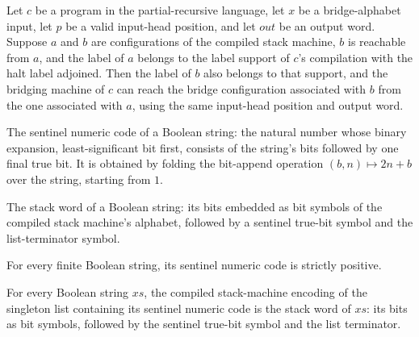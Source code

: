 \begin{lemma}
\label{Turing.bridge_simulate}
\leanok
{}
Let $c$ be a program in the partial-recursive language, let $x$ be a bridge-alphabet
input, let $p$ be a valid input-head position, and let $out$ be an output word. Suppose
$a$ and $b$ are configurations of the compiled stack machine, $b$ is reachable from $a$,
and the label of $a$ belongs to the label support of $c$'s compilation with the halt
label adjoined. Then the label of $b$ also belongs to that support, and the bridging
machine of $c$ can reach the bridge configuration associated with $b$ from the one
associated with $a$, using the same input-head position and output word.
\end{lemma}

\begin{definition}
\label{Turing.bridgeNumber}
\leanok
The sentinel numeric code of a Boolean string: the natural number whose binary
expansion, least-significant bit first, consists of the string's bits followed by
one final true bit.  It is obtained by folding the bit-append operation
$(b, n) \mapsto 2n + b$ over the string, starting from $1$.
\end{definition}

\begin{definition}
\label{Turing.bridgeWord}
\leanok
{}
The stack word of a Boolean string: its bits embedded as bit symbols of the compiled
stack machine's alphabet, followed by a sentinel true-bit symbol and the
list-terminator symbol.
\end{definition}

\begin{lemma}
\label{Turing.bridgeNumber_pos}
\leanok
{}
For every finite Boolean string, its sentinel numeric code is strictly positive.
\end{lemma}

\begin{lemma}
\label{Turing.bridgeWord_number}
\leanok
{}
For every Boolean string $xs$, the compiled stack-machine encoding of the singleton list
containing its sentinel numeric code is the stack word of $xs$: its bits as bit symbols,
followed by the sentinel true-bit symbol and the list terminator.
\end{lemma}

